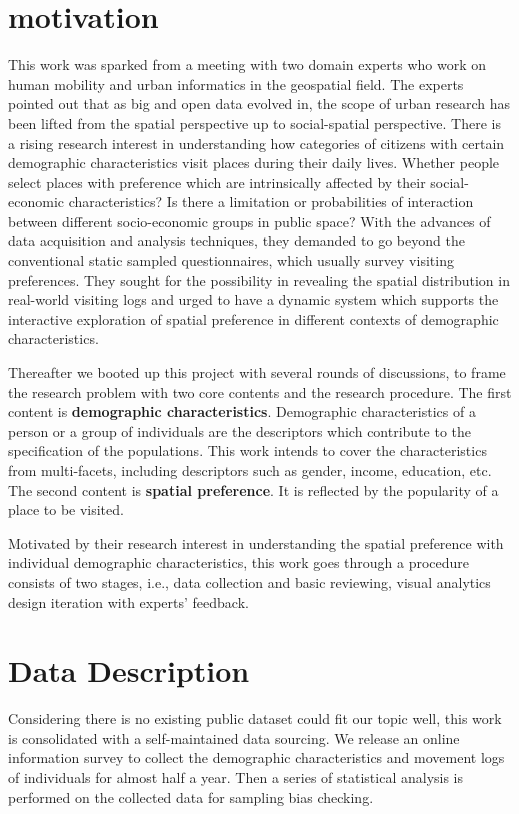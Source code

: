 \documentclass{ieeeaccess}
\begin{document}
\section{motivation}

\label{sec:concept}
This work was sparked from a meeting with two domain experts who work on human mobility and urban informatics in the geospatial field. The experts pointed out that as big and open data evolved in, the scope of urban research has been lifted from the spatial perspective up to social-spatial perspective. There is a rising research interest in understanding how categories of citizens with certain demographic characteristics visit places during their daily lives. Whether people select places with preference which are intrinsically affected by their social-economic characteristics? Is there a limitation or probabilities of interaction between different socio-economic groups in public space? With the advances of data acquisition and analysis techniques, they demanded to go beyond the conventional static sampled questionnaires, which usually survey visiting preferences. They sought for the possibility in revealing the spatial distribution in real-world visiting logs and urged to have a dynamic system which supports the interactive exploration of spatial preference in different contexts of demographic characteristics.

Thereafter we booted up this project with several rounds of discussions, to frame the research problem with two core contents and the research procedure. The first content is \textbf{demographic characteristics}. Demographic characteristics of a person or a group of individuals are the descriptors which contribute to the specification of the populations. This work intends to cover the characteristics from multi-facets, including descriptors such as gender, income, education, etc. The second content is \textbf{spatial preference}. It is reflected by the popularity of a place to be visited.

Motivated by their research interest in understanding the spatial preference with individual demographic characteristics, this work goes through a procedure consists of two stages, i.e., data collection and basic reviewing, visual analytics design iteration with experts' feedback.

\section{Data Description}
\label{subsec:pipeline}
Considering there is no existing public dataset could fit our topic well, this work is consolidated with a self-maintained data sourcing. We release an online information survey to collect the demographic characteristics and movement logs of individuals for almost half a year. Then a series of statistical analysis is performed on the collected data for sampling bias checking.
\end{document}
